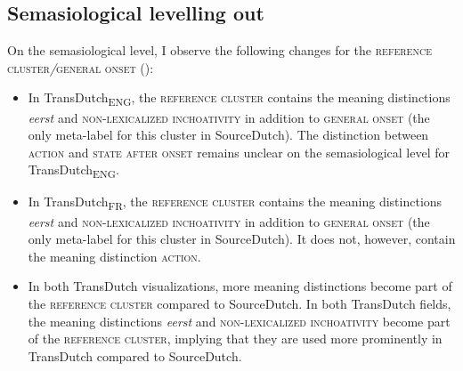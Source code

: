 \subsection{\label{sec:4.5.1}  Semasiological levelling out}

On the semasiological level, I observe the following changes for the \textsc{reference cluster}\textit{/}\textsc{general onset} ():


\begin{itemize}
\item  In TransDutch\textsubscript{ENG}, the \textsc{reference cluster} contains the meaning distinctions \textit{eerst} and {\textsc{non-lexicalized inchoativity}} in addition to \textsc{general onset} (the only meta-label for this cluster in SourceDutch). The distinction between \textsc{action} and \textsc{state after onset} remains unclear on the semasiological level for TransDutch\textsubscript{ENG}.
\item  In TransDutch\textsubscript{FR}, the \textsc{reference cluster} contains the meaning distinctions \textit{eerst} and {\textsc{non-lexicalized inchoativity}} in addition to \textsc{general onset} (the only meta-label for this cluster in SourceDutch). It does not, however, contain the meaning distinction \textsc{action}.
\item  In both TransDutch visualizations, more meaning distinctions become part of the \textsc{reference cluster} compared to SourceDutch. In both TransDutch fields, the meaning distinctions \textit{eerst} and {\textsc{non-lexicalized inchoativity}} become part of the \textsc{reference cluster}, implying that they are used more prominently in TransDutch compared to SourceDutch.
\end{itemize}

